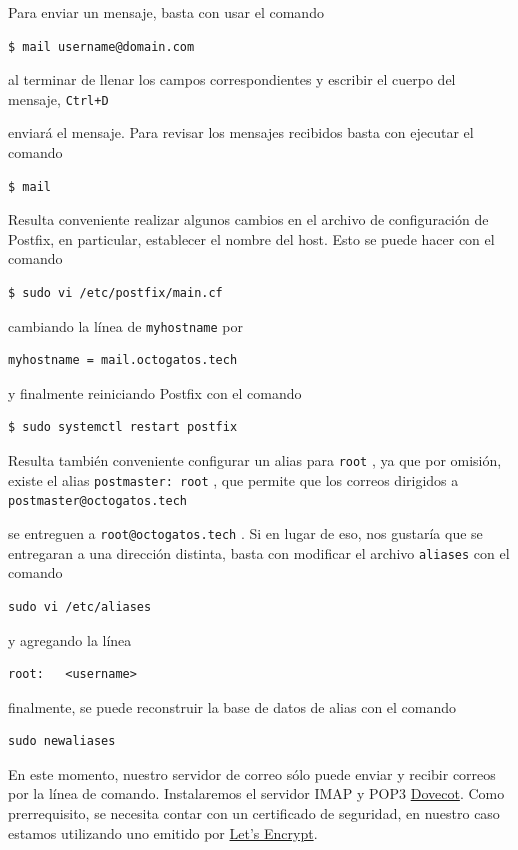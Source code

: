 \documentclass{article}
\newcommand{\ttt}[1]{%
\texttt{#1}%
}
\begin{document}
Para enviar un mensaje, basta con usar el comando
\begin{lstlisting}
$ mail username@domain.com
\end{lstlisting}
al terminar de llenar los campos correspondientes
y escribir el cuerpo del mensaje, \ttt{Ctrl+D}
enviar\'a el mensaje.   Para revisar los mensajes
recibidos basta con ejecutar el comando
\begin{lstlisting}
$ mail
\end{lstlisting}

Resulta conveniente realizar algunos cambios en
el archivo de configuraci\'on de Postfix, en
particular, establecer el nombre del host.   Esto
se puede hacer con el comando
\begin{lstlisting}
$ sudo vi /etc/postfix/main.cf
\end{lstlisting}
cambiando la l\'inea de \ttt{myhostname} por
\begin{lstlisting}
myhostname = mail.octogatos.tech
\end{lstlisting}
y finalmente reiniciando Postfix con el comando
\begin{lstlisting}
$ sudo systemctl restart postfix
\end{lstlisting}

Resulta tambi\'en conveniente configurar un alias
para \ttt{root}, ya que por omisi\'on, existe el
alias \ttt{postmaster: root}, que permite que los
correos dirigidos a \ttt{postmaster@octogatos.tech}
se entreguen a \ttt{root@octogatos.tech}. Si en
lugar de eso, nos gustar\'ia que se entregaran a una
direcci\'on distinta, basta con modificar el archivo
\ttt{aliases} con el comando
\begin{lstlisting}
sudo vi /etc/aliases
\end{lstlisting}
y agregando la l\'inea
\begin{lstlisting}
root:   <username>
\end{lstlisting}
finalmente, se puede reconstruir la base de datos
de alias con el comando
\begin{lstlisting}
sudo newaliases
\end{lstlisting}

En este momento, nuestro servidor de correo s\'olo
puede enviar y recibir correos por la l\'inea de
comando.   Instalaremos el servidor IMAP y POP3
\href{https://www.dovecot.org/}{Dovecot}.   Como
prerrequisito, se necesita contar con un certificado
de seguridad, en nuestro caso estamos utilizando uno
emitido por \href{https://letsencrypt.org/}{Let's
Encrypt}.
\end{document}
